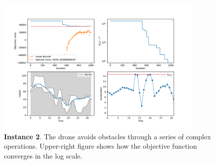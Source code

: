 \documentclass[letterpaper,10pt]{article}
\begin{document}
\begin{figure}
    \centering
    \includegraphics[width=0.9\textwidth]{fig/Figure_2.pdf}
    \caption{\textbf{Instance 2}. The drone avoids obstacles through a series of complex operations. Upper-right figure shows how the objective function converges in the log scale.}
    \label{fig:instance2}
\end{figure}
\end{document}
